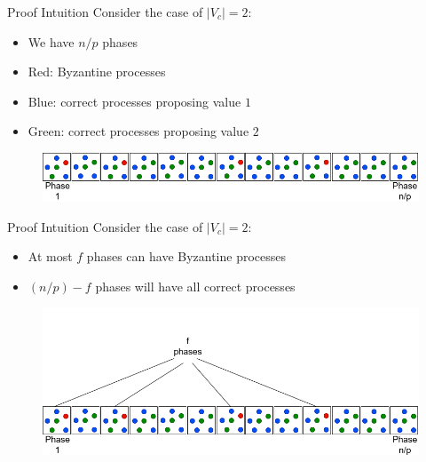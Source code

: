 \documentclass{beamer}
\begin{document}
\begin{frame}{Proof Intuition}
Consider the case of $|V_c|=2$:
\begin{itemize}
    \item We have $n/p$ phases
    \item Red: Byzantine processes
    \item Blue: correct processes proposing value $1$
    \item Green: correct processes proposing value $2$
\end{itemize}
\begin{figure}[t]
\centering
\includegraphics[scale=0.35]{proof2.png}
\vspace{-2em}
\label{fig:SysModel}
\end{figure}
\end{frame}


\begin{frame}{Proof Intuition}
Consider the case of $|V_c|=2$:
\begin{itemize}
    \item At most $f$ phases can have Byzantine processes
    \item $(n/p)-f$ phases will have all correct processes
\end{itemize}
\vspace{-2em}
\begin{figure}[t]
\centering
\includegraphics[scale=0.35]{proof3.png}
\end{figure}
\end{frame}
\end{document}
